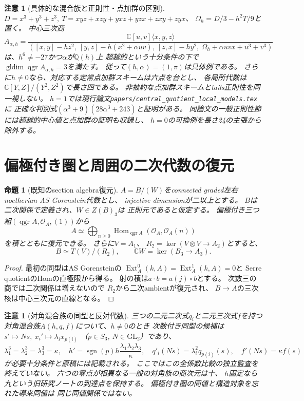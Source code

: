 \documentclass[11pt,a4paper]{ltjsarticle}
\newtheorem{proposition}[theorem]{命題}
\newtheorem{remark}[theorem]{注意}
\newcommand{\CC}{\mathbb C}
\newcommand{\qgr}{\operatorname{qgr}}
\newcommand{\gldim}{\operatorname{gldim}}
\begin{document}
\begin{remark}[具体的な混合族と正則性・点加群の区別]
$D=x^3+y^3+z^3,\ T=xyz+xzy+yxz+yzx+zxy+zyx$、
$\Omega_h=D/3-h^2T/9$と置く。
中心三次商
\[
 A_{\alpha,h}=
 \frac{\CC[u,v]\langle x,y,z\rangle}
 {([x,y]-hz^2,\ [y,z]-h(x^2+\alpha uv),\
 [z,x]-hy^2,\ \Omega_h+\alpha uvx+u^3+v^3)}
\]
は、$h^6\ne-27$かつ$\alpha$が$\mathbb Q(h)$上
超越的という十分条件の下で
$\gldim\qgr A_{\alpha,h}=3$を満たす。
従って$(h,\alpha)=(1,\pi)$は具体例である。
さらに$h\ne0$なら、対応する定常点加群スキームは六点を台とし、
各局所代数は$\CC[Y,Z]/(Y^2,Z^2)$で長さ四である。
非被約な点加群スキームとtails正則性を同一視しない。
$h=1$では現行論文\texttt{papers/central\_quotient\_local\_models.tex}に
正確な判別式$(\alpha^3+9)(28\alpha^3+243)$と証明がある。
同論文の一般正則性節には超越的中心値と点加群の証明も収録し、
$h=0$の可換例を長さ24の主張から除外する。
\end{remark}

\section{偏極付き圏と周囲の二次代数の復元}
\begin{proposition}[既知のsection algebra復元]
$A=B/(W)$をconnected graded左右noetherian AS Gorenstein代数とし、
injective dimensionが二以上とする。
$B$は二次関係で定義され、$W\in Z(B)_3$は
正則元であると仮定する。
偏極付き三つ組$(\qgr A,\mathcal O_A,(1))$から
\[
 A\simeq\bigoplus_{n\ge0}
 \operatorname{Hom}_{\qgr A}(\mathcal O_A,\mathcal O_A(n))
\]
を積とともに復元できる。
さらに$V=A_1$、
$R_2=\ker(V\otimes V\to A_2)$とすると、
\[
 B\simeq T(V)/(R_2),\qquad
 \CC W=\ker(B_3\to A_3).
\]
\end{proposition}
\begin{proof}
最初の同型はAS Gorensteinの
$\operatorname{Ext}_A^0(k,A)=
 \operatorname{Ext}_A^1(k,A)=0$と
Serre quotientのHomの直極限から得る。
射の積は$a\cdot b=a(j)\circ b$とする。
次数三の商では二次関係は増えないので
$R_2$から二次ambientが復元され、
$B\to A$の三次核は中心三次元の直線となる。
\end{proof}
\begin{remark}[対角混合族の同型と反対代数]
三つの二元二次式$q_i$と二元三次式$f$を持つ
対角混合族$A(h,q,f)$について、$h\ne0$のとき
次数付き同型の候補は
$s' \mapsto Ns,\ x_i'\mapsto\lambda_i x_{p(i)}$
（$p\in S_3$, $N\in\mathrm{GL}_2$）であり、
\[
 \lambda_1^3=\lambda_2^3=\lambda_3^3=\kappa,\quad
 h'=\operatorname{sgn}(p)h\frac{\lambda_1\lambda_2\lambda_3}{\kappa},
 \quad q'_i(Ns)=\lambda_i^2q_{p(i)}(s),
 \quad f'(Ns)=\kappa f(s)
\]
が必要十分条件と原稿には記載される。
ここではこの全係数比較の独立監査を終えていない。
六つの零点が相異なる一般の対角族の商次元は十、
$h$固定なら九という旧研究ノートの到達点を保持する。
偏極付き圏の同値と構造対象を忘れた導来同値は
同じ同値関係ではない。
\end{remark}
\end{document}
